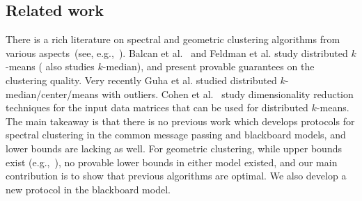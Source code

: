 \subsection{Related work}  There is a rich literature on spectral and geometric clustering algorithms from various aspects~(see, e.g.,~\cite{k-means++,nips02,PSZ15,luxburg07}). Balcan et al.~\cite{BEL13,BKLW14} and Feldman et al. \cite{FSS13} study distributed $k$-means (\cite{BEL13} also studies $k$-median), and present provable guarantees on the clustering quality. Very recently Guha et al. \cite{GLZ17} studied distributed $k$-median/center/means with outliers.  %
Cohen et al.~\cite{journals/corr/CohenEMMP14} study dimensionality reduction techniques for the input data matrices that can be used for distributed $k$-means. The main takeaway  is that there is no previous work which develops protocols for spectral clustering in the common message passing and blackboard models, and lower bounds are lacking as well. For geometric clustering, while upper bounds exist (e.g.,~\cite{BEL13,BKLW14,FSS13}), no provable lower bounds in either model existed, and our main contribution is to show that previous algorithms are optimal. We also develop a new protocol in the blackboard model.  
%
%
%
%
%



